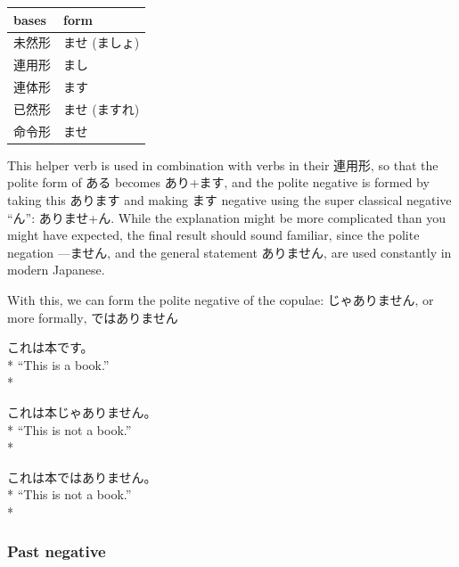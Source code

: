 \documentclass[11pt, b5paper, twoside, openright, onecolumn]{book}
\newenvironment{exampleblock}{
\setlength{\parindent}{0.6in}
\begin{minipage}[t]{\dimexpr\textwidth-\parindent}}
{\end{minipage}}
\newenvironment{mytabular}[1]{\noindent\hspace{0.4in}
\begin{tabular}[h]{#1}}{\end{tabular}}
\begin{document}
\vspace{0.5cm}
\smaller
\begin{mytabular}{| l  l |}\hline 
\rule{0pt}{2.4ex}bases & form\\ 
\hline
\rule{0pt}{2.4ex}未然形 & ませ (ましょ)\\ 
\rule{0pt}{2.4ex}連用形 & まし\\ 
\rule{0pt}{2.4ex}連体形 & ます\\ 
\rule{0pt}{2.4ex}已然形 & ませ (ますれ)\\ 
\rule{0pt}{2.4ex}命令形 & ませ\\ 
\hline 
\end{mytabular}
\larger
\vspace{0.5cm}


This helper verb is used in combination with verbs in their 連用形‚ so that the polite form of ある becomes あり+ます‚ and the polite negative is formed by taking this あります and making ます negative using the super classical negative “ん”: ありませ+ん. While the explanation might be more complicated than you might have expected‚ the final result should sound familiar‚ since the polite negation —ません‚ and the general statement ありません‚ are used constantly in modern Japanese.

With this‚ we can form the polite negative of the copulae: じゃありません‚ or more formally‚ ではありません

\vspace{0.4cm}
\begin{exampleblock}
これは本です。 \\* 
“This is a book.” \\* 
\end{exampleblock}
\vspace{0.2cm}

\begin{exampleblock}
これは本じゃありません。 \\* 
“This is not a book.” \\* 
\end{exampleblock}
\vspace{0.2cm}

\begin{exampleblock}
これは本ではありません。 \\* 
“This is not a book.” \\* 
\end{exampleblock}
\subsubsection{Past negative}
\end{document}
